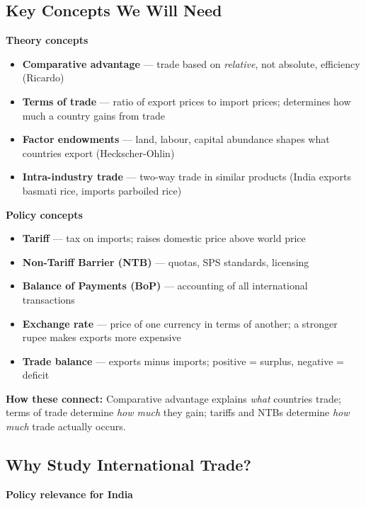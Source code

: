 \documentclass[
  letterpaper,
  DIV=11,
  numbers=noendperiod]{scrartcl}
\providecommand{\tightlist}{%
  \setlength{\itemsep}{0pt}\setlength{\parskip}{0pt}}
\begin{document}
\subsection{Key Concepts We Will Need}\label{key-concepts-we-will-need}

\textbf{Theory concepts}

\begin{itemize}
\tightlist
\item
  \textbf{Comparative advantage} --- trade based on \emph{relative}, not
  absolute, efficiency (Ricardo)
\item
  \textbf{Terms of trade} --- ratio of export prices to import prices;
  determines how much a country gains from trade
\item
  \textbf{Factor endowments} --- land, labour, capital abundance shapes
  what countries export (Heckscher-Ohlin)
\item
  \textbf{Intra-industry trade} --- two-way trade in similar products
  (India exports basmati rice, imports parboiled rice)
\end{itemize}

\textbf{Policy concepts}

\begin{itemize}
\tightlist
\item
  \textbf{Tariff} --- tax on imports; raises domestic price above world
  price
\item
  \textbf{Non-Tariff Barrier (NTB)} --- quotas, SPS standards, licensing
\item
  \textbf{Balance of Payments (BoP)} --- accounting of all international
  transactions
\item
  \textbf{Exchange rate} --- price of one currency in terms of another;
  a stronger rupee makes exports more expensive
\item
  \textbf{Trade balance} --- exports minus imports; positive = surplus,
  negative = deficit
\end{itemize}

\textbf{How these connect:} Comparative advantage explains \emph{what}
countries trade; terms of trade determine \emph{how much} they gain;
tariffs and NTBs determine \emph{how much} trade actually occurs.

\subsection{Why Study International
Trade?}\label{why-study-international-trade}

\textbf{Policy relevance for India}
\end{document}
